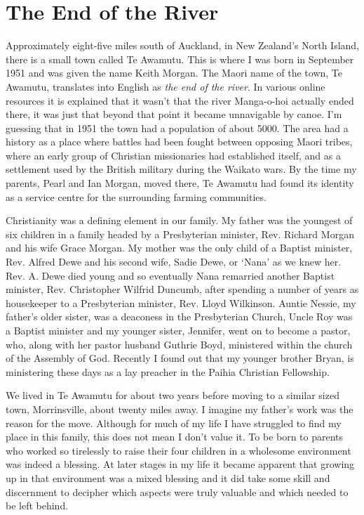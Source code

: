 \chapter{The End of the River}

Approximately eight-five miles south of Auckland, in New Zealand's North
Island, there is a small town called Te Awamutu. This is where I was
born in September 1951 and was given the name Keith Morgan. The Maori
name of the town, Te Awamutu, translates into English as \emph{the end
  of the river}. In various online resources\cite{early-history}
it is explained that it wasn't that the river
Manga-o-hoi actually ended there, it was just that beyond that point it
became unnavigable by canoe. I'm guessing that in 1951 the town had a
population of about 5000. The area had a history as a place where
battles had been fought between opposing Maori tribes, where an early
group of Christian missionaries had established itself, and as a
settlement used by the British military during the Waikato wars. By the
time my parents, Pearl and Ian Morgan, moved there, Te Awamutu had found
its identity as a service centre for the surrounding farming
communities.

Christianity was a defining element in our family. My father was the
youngest of six children in a family headed by a Presbyterian minister,
Rev. Richard Morgan and his wife Grace Morgan. My mother was the only
child of a Baptist minister, Rev. Alfred Dewe and his second wife, Sadie
Dewe, or `Nana' as we knew her. Rev. A. Dewe died young and so eventually
Nana remarried another Baptist minister, Rev. Christopher Wilfrid
Duncumb, after spending a number of years as housekeeper to a
Presbyterian minister, Rev. Lloyd Wilkinson. Auntie Nessie, my father's
older sister, was a deaconess in the Presbyterian Church, Uncle Roy was a Baptist
minister and my younger sister, Jennifer, went on to become a pastor,
who, along with her pastor husband Guthrie Boyd, ministered within the
church of the Assembly of God. Recently I found out that my younger
brother Bryan, is ministering these days as a lay preacher in the Paihia
Christian Fellowship.

We lived in Te Awamutu for about two years before moving to a similar
sized town, Morrinsville, about twenty miles away. I imagine my father's
work was the reason for the move. Although for much of my life I have
struggled to find my place in this family, this does not mean I don't
value it. To be born to parents who worked so tirelessly to raise their
four children in a wholesome environment was indeed a blessing. At later
stages in my life it became apparent that growing up in that environment
was a mixed blessing and it did take some skill and discernment to
decipher which aspects were truly valuable and which needed to be left
behind.

